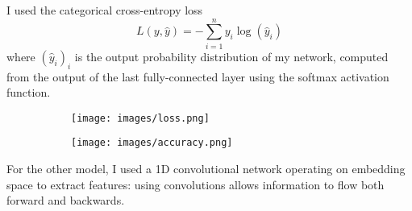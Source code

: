 \documentclass{article}
\begin{document}
I used the categorical cross-entropy loss
\begin{equation}
	L(y,\hat{y}) =
	-\sum_{i=1}^{n} y_i \log(\hat{y}_i)
\end{equation}
where $(\hat{y}_i)_i$ is the output probability distribution of my network, computed from the output of the last fully-connected layer using the softmax activation function.

\begin{figure}[h]
	\centering
	\begin{subfigure}{.49\linewidth}
	\texttt{[image: images/loss.png]}	
	\end{subfigure}
	\begin{subfigure}{.49\linewidth}
	\texttt{[image: images/accuracy.png]}	
	\end{subfigure}
\end{figure}


For the other model, I used a 1D convolutional network operating on embedding space to extract features: using convolutions allows information to flow both forward and backwards.
\end{document}
